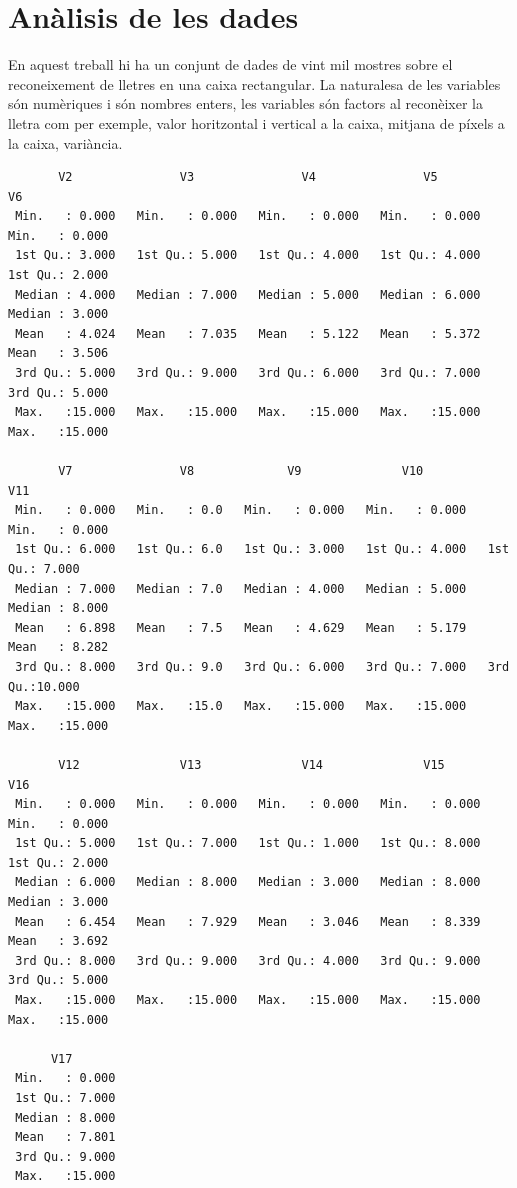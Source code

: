 \section{Anàlisis de les dades}
En aquest treball hi ha un conjunt de dades de vint mil mostres sobre el reconeixement de lletres en una caixa rectangular. La naturalesa de les variables són numèriques i són nombres enters, les variables són factors al reconèixer la lletra com per exemple, valor horitzontal i vertical a la caixa, mitjana de píxels a la caixa, variància.

\begin{verbatim}
       V2               V3               V4               V5               V6        
 Min.   : 0.000   Min.   : 0.000   Min.   : 0.000   Min.   : 0.000   Min.   : 0.000  
 1st Qu.: 3.000   1st Qu.: 5.000   1st Qu.: 4.000   1st Qu.: 4.000   1st Qu.: 2.000  
 Median : 4.000   Median : 7.000   Median : 5.000   Median : 6.000   Median : 3.000  
 Mean   : 4.024   Mean   : 7.035   Mean   : 5.122   Mean   : 5.372   Mean   : 3.506  
 3rd Qu.: 5.000   3rd Qu.: 9.000   3rd Qu.: 6.000   3rd Qu.: 7.000   3rd Qu.: 5.000  
 Max.   :15.000   Max.   :15.000   Max.   :15.000   Max.   :15.000   Max.   :15.000
 
       V7               V8             V9              V10              V11        
 Min.   : 0.000   Min.   : 0.0   Min.   : 0.000   Min.   : 0.000   Min.   : 0.000  
 1st Qu.: 6.000   1st Qu.: 6.0   1st Qu.: 3.000   1st Qu.: 4.000   1st Qu.: 7.000  
 Median : 7.000   Median : 7.0   Median : 4.000   Median : 5.000   Median : 8.000  
 Mean   : 6.898   Mean   : 7.5   Mean   : 4.629   Mean   : 5.179   Mean   : 8.282  
 3rd Qu.: 8.000   3rd Qu.: 9.0   3rd Qu.: 6.000   3rd Qu.: 7.000   3rd Qu.:10.000  
 Max.   :15.000   Max.   :15.0   Max.   :15.000   Max.   :15.000   Max.   :15.000
 
       V12              V13              V14              V15              V16           
 Min.   : 0.000   Min.   : 0.000   Min.   : 0.000   Min.   : 0.000   Min.   : 0.000   
 1st Qu.: 5.000   1st Qu.: 7.000   1st Qu.: 1.000   1st Qu.: 8.000   1st Qu.: 2.000   
 Median : 6.000   Median : 8.000   Median : 3.000   Median : 8.000   Median : 3.000   
 Mean   : 6.454   Mean   : 7.929   Mean   : 3.046   Mean   : 8.339   Mean   : 3.692   
 3rd Qu.: 8.000   3rd Qu.: 9.000   3rd Qu.: 4.000   3rd Qu.: 9.000   3rd Qu.: 5.000     
 Max.   :15.000   Max.   :15.000   Max.   :15.000   Max.   :15.000   Max.   :15.000   

      V17     
 Min.   : 0.000  
 1st Qu.: 7.000  
 Median : 8.000  
 Mean   : 7.801  
 3rd Qu.: 9.000
 Max.   :15.000
\end{verbatim}


